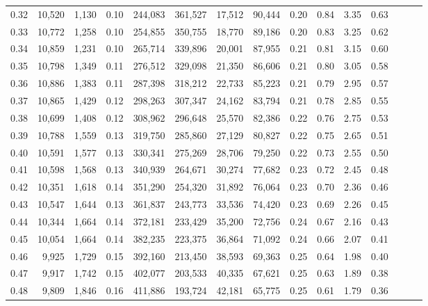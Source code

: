 \begin{tabular}{rrrrrrrrrrrrrrr}
0.32 &  10,520 &  1,130 &  0.10 &  244,083 &  361,527 &   17,512 &   90,444 &  0.20 &  0.84 &  3.35 &      0.63 \\
0.33 &  10,772 &  1,258 &  0.10 &  254,855 &  350,755 &   18,770 &   89,186 &  0.20 &  0.83 &  3.25 &      0.62 \\
0.34 &  10,859 &  1,231 &  0.10 &  265,714 &  339,896 &   20,001 &   87,955 &  0.21 &  0.81 &  3.15 &      0.60 \\
0.35 &  10,798 &  1,349 &  0.11 &  276,512 &  329,098 &   21,350 &   86,606 &  0.21 &  0.80 &  3.05 &      0.58 \\
0.36 &  10,886 &  1,383 &  0.11 &  287,398 &  318,212 &   22,733 &   85,223 &  0.21 &  0.79 &  2.95 &      0.57 \\
0.37 &  10,865 &  1,429 &  0.12 &  298,263 &  307,347 &   24,162 &   83,794 &  0.21 &  0.78 &  2.85 &      0.55 \\
0.38 &  10,699 &  1,408 &  0.12 &  308,962 &  296,648 &   25,570 &   82,386 &  0.22 &  0.76 &  2.75 &      0.53 \\
0.39 &  10,788 &  1,559 &  0.13 &  319,750 &  285,860 &   27,129 &   80,827 &  0.22 &  0.75 &  2.65 &      0.51 \\
0.40 &  10,591 &  1,577 &  0.13 &  330,341 &  275,269 &   28,706 &   79,250 &  0.22 &  0.73 &  2.55 &      0.50 \\
0.41 &  10,598 &  1,568 &  0.13 &  340,939 &  264,671 &   30,274 &   77,682 &  0.23 &  0.72 &  2.45 &      0.48 \\
0.42 &  10,351 &  1,618 &  0.14 &  351,290 &  254,320 &   31,892 &   76,064 &  0.23 &  0.70 &  2.36 &      0.46 \\
0.43 &  10,547 &  1,644 &  0.13 &  361,837 &  243,773 &   33,536 &   74,420 &  0.23 &  0.69 &  2.26 &      0.45 \\
0.44 &  10,344 &  1,664 &  0.14 &  372,181 &  233,429 &   35,200 &   72,756 &  0.24 &  0.67 &  2.16 &      0.43 \\
0.45 &  10,054 &  1,664 &  0.14 &  382,235 &  223,375 &   36,864 &   71,092 &  0.24 &  0.66 &  2.07 &      0.41 \\
0.46 &   9,925 &  1,729 &  0.15 &  392,160 &  213,450 &   38,593 &   69,363 &  0.25 &  0.64 &  1.98 &      0.40 \\
0.47 &   9,917 &  1,742 &  0.15 &  402,077 &  203,533 &   40,335 &   67,621 &  0.25 &  0.63 &  1.89 &      0.38 \\
0.48 &   9,809 &  1,846 &  0.16 &  411,886 &  193,724 &   42,181 &   65,775 &  0.25 &  0.61 &  1.79 &      0.36 \\

\end{tabular}
